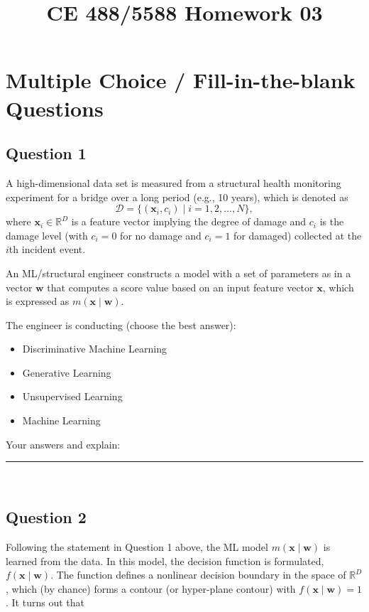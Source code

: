 \documentclass[12pt]{article}
\begin{document}
\title{CE 488/5588 Homework 03\\
\vspace{2in}
\author{}
}
\maketitle

\newpage 

\doublespacing

\section{Multiple Choice / Fill-in-the-blank Questions}

\subsection*{Question 1}

A high-dimensional data set is measured from a structural health monitoring experiment for a bridge over a long period (e.g., 10 years), which is denoted as
\[
\mathcal{D} = \{(\bm{x}_i, c_i) \mid i = 1, 2, \ldots, N\},
\]
where \(\bm{x}_i \in \mathbb{R}^D\) is a feature vector implying the degree of damage and \(c_i\) is the damage level (with \(c_i=0\) for no damage and \(c_i=1\) for damaged) collected at the \(i\)th incident event.

An ML/structural engineer constructs a model with a set of parameters as in a vector \(\bm{w}\) that computes a score value based on an input feature vector \(\bm{x}\), which is expressed as \(m(\bm{x}\mid \bm{w})\).

The engineer is conducting (choose the best answer):
\begin{itemize}
    \item [A.] Discriminative Machine Learning
    \item [B.]Generative Learning
    \item [C.]Unsupervised Learning
    \item [D.] Machine Learning
\end{itemize}
Your answers and explain: \rule{1in}{0.15mm}\\
\fullunderline 

\newpage
\subsection*{Question 2} 

Following the statement in Question 1 above, the ML model \(m(\bm{x}\mid \bm{w})\) is learned from the data. In this model, the decision function is formulated, $f(\bm{x}\mid \bm{w})$. The function defines a nonlinear decision boundary in the space of $\mathbb{R}^D$,  which (by chance) forms a contour (or hyper-plane contour) with $f(\bm{x}\mid \bm{w}) = 1$. It turns out that 
\end{document}

